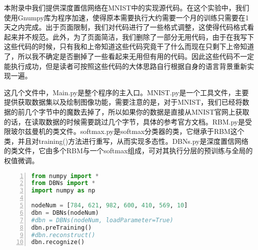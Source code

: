 
\appendix

%
本附录中我们提供深度置信网络在MNIST中的实现源代码。在这个实验中，我们使用Gnumpy库为程序加速，使得原本需要执行大约需要一个月的训练只需要在1天之内完成。出于页面限制，我们对代码进行了一些格式调整，这使得代码格式看起来并不规范。此外，为了页面简洁，我们删除了一部分无用代码，由于在我写下这些代码的时候，只有我和上帝知道这些代码究竟干了什么而现在只剩下上帝知道了，所以我不确定是否删掉了一些看起来无用但有用的代码。因此这些代码不一定能执行成功，但是读者可按照这些代码的大体思路自行根据自身的语言背景重新实现一遍。

这几个文件中，Main.py是整个程序的主入口。MNIST.py是一个工具文件，主要提供获取数据集以及绘制图像功能，需要注意的是，对于MNIST，我们已经将数据的前几个字节中的魔数去掉了，所以如果你的数据是直接从MNIST官网上获取的话，在读取数据的时候需要跳过几个字节，具体的参考官方文档。RBM.py是受限玻尔兹曼机的类文件。softmax.py是softmax分类器的类，它继承于RBM这个类，并且对training()方法进行重写，从而实现多态性。DBNs.py是深度置信网络的类文件，它由多个RBM与一个softmax组成，可对其执行分层的预训练与全局的权值微调。

\begin{lstlisting}[language=Python,numbers=left, frame=shadowbox, rulesepcolor=\color{cadegrey}, caption=\text{Main.py}]
from numpy import *
from DBNs import *
import numpy as np

nodeNum = [784, 621, 982, 600, 410, 569, 10]
dbn = DBNs(nodeNum)
#dbn = DBNs(nodeNum, loadParameter=True)
dbn.preTraining()
#dbn.reconstruct()
dbn.recognize()
\end{lstlisting}

\newpage

